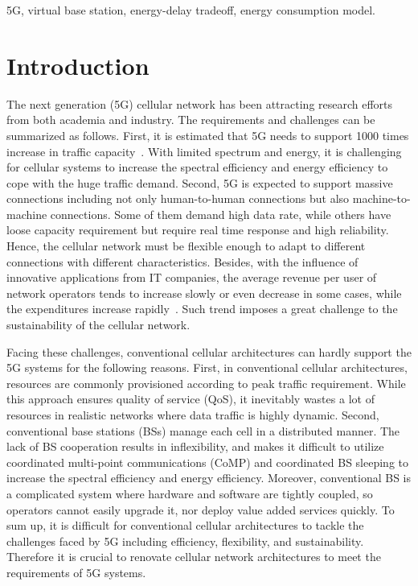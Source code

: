 \documentclass[conference]{IEEEtran}
\begin{document}
\begin{IEEEkeywords}
  5G, virtual base station, energy-delay tradeoff, energy consumption model.
\end{IEEEkeywords}

\section{Introduction}
\label{sec:intro}

The next generation (5G) cellular network has been attracting research efforts
from both academia and industry.
The requirements and challenges can be summarized as
follows.  First, it is estimated that 5G needs to support 1000 times increase
in traffic capacity~\cite{4gamericas2013meeting}. With limited spectrum and
energy, it is challenging for cellular systems to increase the spectral
efficiency and energy efficiency to cope with the huge traffic demand. Second, 5G
is expected to support massive connections including not only human-to-human
connections but also machine-to-machine connections. Some
of them demand high data rate, while others have loose capacity
requirement but require real time response and high reliability. Hence, the
cellular network must be flexible enough to adapt to different connections with
different characteristics. Besides, with the influence of innovative
applications from IT companies, the average revenue per user of
network operators tends to
increase slowly or even decrease in some cases, while the expenditures increase
rapidly~\cite{cmri2013cran}. Such trend imposes a great challenge to the
sustainability of the cellular network.

Facing these challenges, conventional cellular architectures can hardly support
the 5G systems for the following reasons. First, in conventional cellular
architectures, resources are commonly provisioned according to peak traffic
requirement. While this approach ensures quality of service (QoS), it inevitably wastes a
lot of resources in realistic networks where data traffic is highly dynamic.
Second, conventional base stations (BSs) manage each cell in a distributed
manner. The lack of BS cooperation results in inflexibility, and makes it
difficult to utilize coordinated multi-point communications (CoMP) and
coordinated BS sleeping to increase the spectral efficiency and energy efficiency.
Moreover, conventional BS is a complicated system where hardware and software
are tightly coupled, so operators cannot easily upgrade it, nor deploy value
added services quickly. To sum up, it is difficult for conventional cellular
architectures to tackle the challenges faced by 5G including efficiency,
flexibility, and sustainability.  Therefore it is crucial to renovate
cellular network architectures to meet the requirements of 5G systems.
\end{document}
